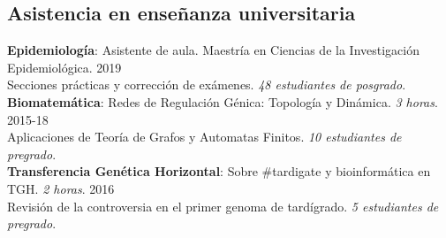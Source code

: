 \documentclass[margin,line]{res}
\begin{document}
\begin{resume}
		\section{\sc Asistencia en enseñanza universitaria}
		{\bf Epidemiología}: Asistente de aula. Maestría en Ciencias de la Investigación Epidemiológica. \hfill {2019}\\Secciones prácticas y corrección de exámenes. \textit{48 estudiantes de posgrado}. \\[4pt] %
		{\bf Biomatemática}: Redes de Regulación Génica: Topología y Dinámica. \textit{3 horas}. \hfill {2015-18}\\ Aplicaciones de Teoría de Grafos y Automatas Finitos. \textit{10 estudiantes de pregrado}. \\[4pt] %
		{\bf Transferencia Genética Horizontal}: Sobre \#tardigate y bioinformática en TGH. \textit{2 horas}. \hfill {2016}\\ Revisión de la controversia en el primer genoma de tardígrado. \textit{5 estudiantes de pregrado}.
		
		
		
		
		
		

\end{resume}
\end{document}
